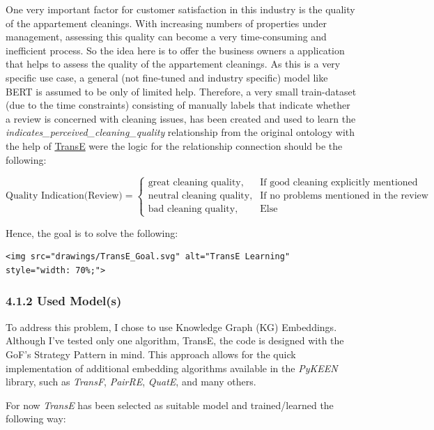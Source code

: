 \documentclass[
]{article}
\begin{document}
One very important factor for customer satisfaction in this industry is
the quality of the appartement cleanings. With increasing numbers of
properties under management, assessing this quality can become a very
time-consuming and inefficient process. So the idea here is to offer the
business owners a application that helps to assess the quality of the
appartement cleanings. As this is a very specific use case, a general
(not fine-tuned and industry specific) model like BERT is assumed to be
only of limited help. Therefore, a very small train-dataset (due to the
time constraints) consisting of manually labels that indicate whether a
review is concerned with cleaning issues, has been created and used to
learn the \emph{indicates\_perceived\_cleaning\_quality} relationship
from the original ontology with the help of
\href{https://proceedings.neurips.cc/paper_files/paper/2013/file/1cecc7a77928ca8133fa24680a88d2f9-Paper.pdf}{TransE}
were the logic for the relationship connection should be the following:

\[
\text{Quality Indication(Review)} = 
\begin{cases}
\text{great cleaning quality}, & \text{If good cleaning explicitly mentioned }  \\
\text{neutral cleaning quality}, & \text{If no problems mentioned in the review }  \\ 
\text{bad cleaning quality}, & \text{Else }
\end{cases}
\]

Hence, the goal is to solve the following:

\begin{verbatim}
<img src="drawings/TransE_Goal.svg" alt="TransE Learning" style="width: 70%;">
\end{verbatim}

\subsubsection{4.1.2 Used Model(s)}\label{used-models}

To address this problem, I chose to use Knowledge Graph (KG) Embeddings.
Although I've tested only one algorithm, TransE, the code is designed
with the GoF's Strategy Pattern in mind. This approach allows for the
quick implementation of additional embedding algorithms available in the
\emph{PyKEEN} library, such as \emph{TransF}, \emph{PairRE},
\emph{QuatE}, and many others.

For now \emph{TransE} has been selected as suitable model and
trained/learned the following way:
\end{document}
